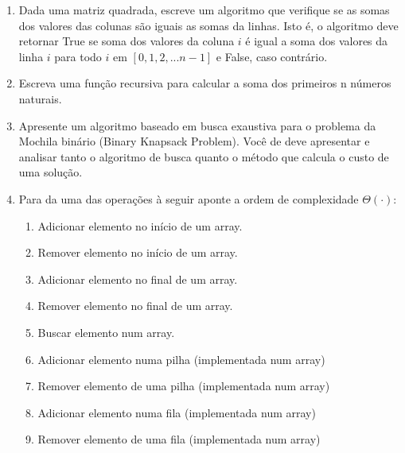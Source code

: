 \documentclass[12pt]{article}
\begin{document}
\begin{enumerate}
    \item Dada uma matriz quadrada, escreve um algoritmo que verifique se as somas dos valores das colunas são iguais as somas da linhas. Isto é, o algoritmo deve retornar True se soma dos valores da coluna $i$ é igual a soma dos valores da linha $i$ para todo $i$ em $[0,1,2,...n-1]$ e False, caso contrário.
    
%
%
%
%
%


    \item Escreva uma função recursiva para calcular a soma dos primeiros n números naturais.
    
    \item Apresente um algoritmo baseado em busca exaustiva para o problema da Mochila binário (Binary Knapsack Problem). Você de deve apresentar e analisar tanto o algoritmo de busca quanto o método que calcula o custo de uma solução.
    
    \item Para da uma das operações à seguir aponte a ordem de complexidade $\Theta(\cdot)$:
    \begin{enumerate}
        \item Adicionar elemento no início de um array.
        \item Remover elemento no início de um array.
        \item Adicionar elemento no final de um array.
        \item Remover elemento no final de um array.
        \item Buscar elemento num array.
        \item Adicionar elemento numa pilha (implementada num array)
        \item Remover elemento de uma pilha (implementada num array)
        \item Adicionar elemento numa fila (implementada num array)
        \item Remover elemento de uma fila (implementada num array)
    \end{enumerate}

\end{enumerate}
\end{document}
